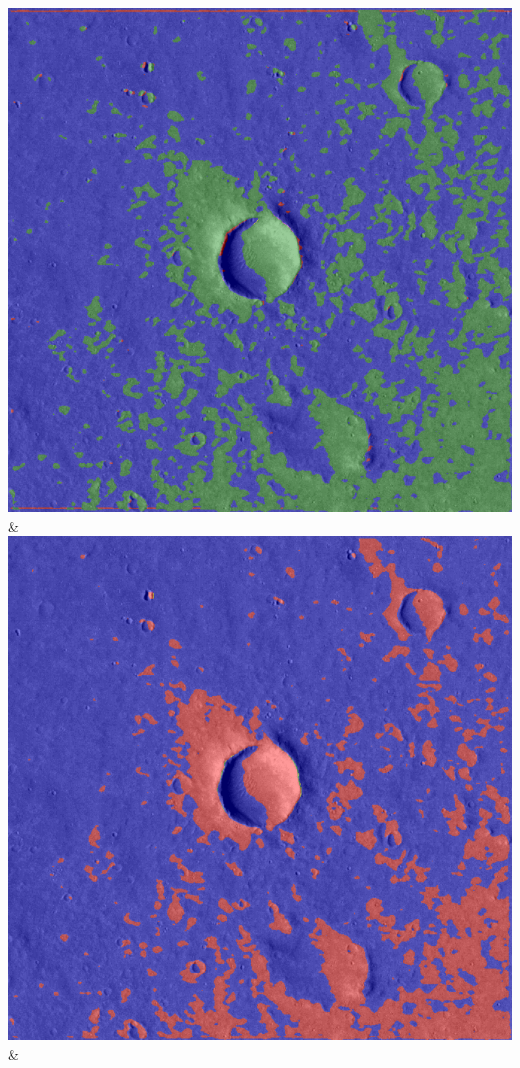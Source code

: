 \begin{table}[h!]
\begin{tabularx}{\textwidth}
		\includegraphics[width=0.9\linewidth]{images/gen/number_of_segments/p03_01.png_10.png} &
		\includegraphics[width=0.9\linewidth]{images/gen/number_of_segments/p03_01.png_20.png} &

\end{tabularx}
\end{table}
